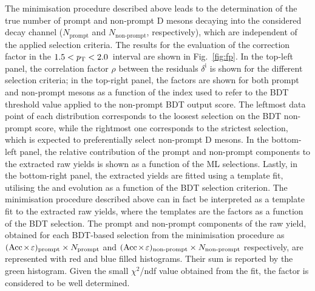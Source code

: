 The minimisation procedure described above leads to the determination of the true number of prompt and non-prompt D mesons decaying into the considered decay channel ($N_\mathrm{prompt}$ and $N_\mathrm{non\text{-}prompt}$, respectively), which are independent of the applied selection criteria. The results for the evaluation of the \ds \fp correction factor in the $1.5<p_\mathrm{T}<2.0$~\gevc interval are shown in Fig.~\ref{fig:fp}. In the top-left panel, the correlation factor $\rho$ between the residuals $\delta^\mathrm{i}$ is shown for the different selection criteria; in the top-right panel, the \aeff factors are shown for both prompt and non-prompt \ds mesons as a function of the index used to refer to the BDT threshold value applied to the non-prompt BDT output score. The leftmost data point of each distribution corresponds to the loosest selection on the BDT non-prompt score, while the rightmost one corresponds to the strictest selection, which is expected to preferentially select non-prompt D mesons. In the bottom-left panel, the relative contribution of the prompt and non-prompt components to the extracted \ds raw yields is shown as a function of the ML selections. Lastly, in the bottom-right panel, the extracted yields are fitted using a template fit, utilising the \aeffpds and \aeffnpds evolution as a function of the BDT selection criterion. The minimisation procedure described above can in fact be interpreted as a template fit to the extracted raw yields, where the templates are the \aeff factors as a function of the BDT selection. The prompt and non-prompt components of the raw yield, obtained for each BDT-based selection from the minimisation procedure as \mbox{$(\mathrm{Acc}\mkern-2mu\times\mkern-2mu\varepsilon)_\mathrm{prompt}\times N_\mathrm{prompt}$} and $(\mathrm{Acc}\mkern-2mu\times\mkern-2mu\varepsilon)_\mathrm{non\text{-}prompt}\times N_\mathrm{non\text{-}prompt}$ respectively, are represented with red and blue filled histograms. Their sum is reported by the green histogram. Given the small $\chi^2$/ndf value obtained from the fit, the \fp factor is considered to be well determined. 
